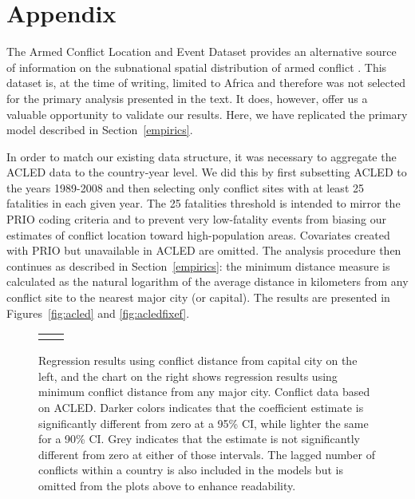 
\section{Appendix}
\label{appendix}

The Armed Conflict Location and Event Dataset provides an alternative source of information on the subnational spatial distribution of armed conflict \citep{raleigh:linke:etal:2010}. This dataset is, at the time of writing, limited to Africa and therefore was not selected for the primary analysis presented in the text. It does, however, offer us a valuable opportunity to validate our results. Here, we have replicated the primary model described in Section~\ref{empirics}.

In order to match our existing data structure, it was necessary to aggregate the ACLED data to the country-year level. We did this by first subsetting ACLED to the years 1989-2008 and then selecting only conflict sites with at least 25 fatalities in each given year. The 25 fatalities threshold is intended to mirror the PRIO coding criteria and to prevent very low-fatality events from biasing our estimates of conflict location toward high-population areas. Covariates created with PRIO but unavailable in ACLED are omitted. The analysis procedure then continues as described in Section~\ref{empirics}: the minimum distance measure is calculated as the natural logarithm of the average distance in kilometers from any conflict site to the nearest major city (or capital). The results are presented in Figures~\ref{fig:acled} and \ref{fig:acledfixef}. 

\begin{figure}
	\centering
	\begin{tabular}{cc}
		\subfloat[SubFigure 1][Capital City]{
			\resizebox{.45\textwidth}{!}{}
		\label{fig:acled}} &
		\subfloat[SubFigure 2][Any Major City]{
			\resizebox{.45\textwidth}{!}{}
		\label{fig:acledfixef}}
	\end{tabular}
	\caption{Regression results using conflict distance from capital city on the left, and the chart on the right shows regression results using minimum conflict distance from any major city. Conflict data based on ACLED. Darker colors indicates that the coefficient estimate is significantly different from zero at a 95\% CI, while lighter the same for a 90\% CI. Grey indicates that the estimate is not significantly different from zero at either of those intervals. The lagged number of conflicts within a country is also included in the models but is omitted from the plots above to enhance readability.}
	\label{fig:coefplot}
\end{figure}
